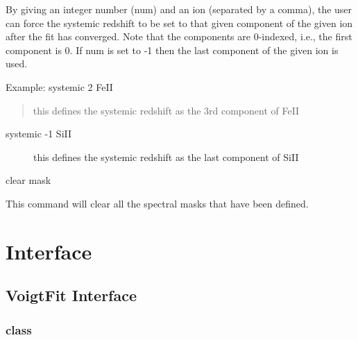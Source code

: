 \documentclass[letterpaper,10pt,english]{sphinxmanual}
\begin{document}
By giving an integer number (num) and an ion (separated by a comma), the user can force the systemic redshift to be set to that given component of the given ion after the fit has converged. Note that the components are 0-indexed, i.e., the first component is 0. If num is set to -1 then the last component of the given ion is used.

Example:
systemic  2   FeII
\begin{quote}

this defines the systemic redshift as the 3rd component of FeII
\end{quote}
\begin{description}
\item[{systemic  -1  SiII}] \leavevmode
this defines the systemic redshift as the last component of SiII

\end{description}

clear mask

This command will clear all the spectral masks that have been defined.


\chapter{Interface}
\label{\detokenize{index:interface}}

\section{VoigtFit Interface}
\label{\detokenize{api:voigtfit-interface}}\label{\detokenize{api::doc}}

\subsection{class }
\label{\detokenize{api:class-dataset}}
\end{document}
